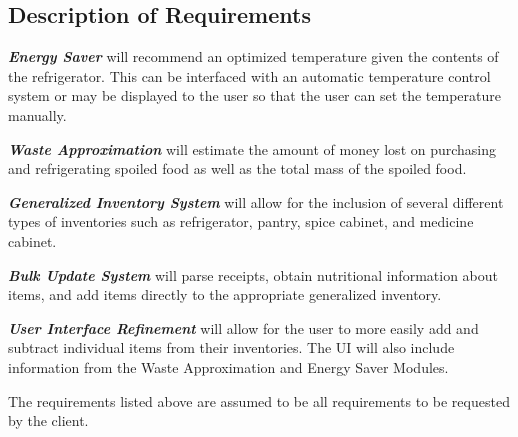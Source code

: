 \documentclass[10pt]{article}
\begin{document}
\subsection{Description of Requirements}
\begin{description}
		\item {\itshape\bfseries Energy Saver} will recommend an optimized temperature given the contents of the refrigerator. This can be interfaced with an automatic temperature control system or may be displayed to the user so that the user can set the temperature manually.  
		\item {\itshape\bfseries Waste Approximation} will estimate the amount of money lost on purchasing and refrigerating spoiled food as well as the total mass of the spoiled food.
		\item {\itshape\bfseries Generalized Inventory System} will allow for the inclusion of several different types of inventories such as refrigerator, pantry, spice cabinet, and medicine cabinet.
		\item {\itshape\bfseries Bulk Update System} will parse receipts, obtain nutritional information about items, and add items directly to the appropriate generalized inventory. 
		\item {\itshape\bfseries User Interface Refinement} will allow for the user to more easily add and subtract individual items from their inventories. The UI will also include information from the Waste Approximation and Energy Saver Modules. 
\end{description}

The requirements listed above are assumed to be all requirements to be requested by the client. 
\end{document}
